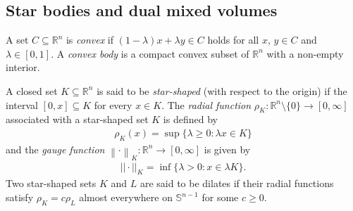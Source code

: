 \documentclass[preprint,12pt]{elsarticle}
\begin{document}
	\subsection{Star bodies and dual mixed volumes}
	
	A set $ C \subseteq \mathbb{R}^{n} $ is {\it convex} if $ \left( 1-\lambda \right)x + \lambda y \in C $ holds for all $ x$, $y \in C $ and $ \lambda \in \left[ 0,1 \right] $. A {\it convex body} is a compact convex subset of $\mathbb{R}^{n}$ with a non-empty interior.
	
	A closed set $K \subseteq \mathbb{R}^{n}$ is said to be {\it star-shaped} (with respect to the origin) if the interval $\left[ 0,x \right] \subseteq K$ for every $x \in K$.
	The {\it radial function} $\rho_K:\mathbb{R}^n \setminus \{0\} \to [0,\infty ]$ associated with a star-shaped set $K$ is defined by
	\begin{eqnarray}
		{\rho}_{K}(x)=\sup\{ \lambda \geq 0:\lambda x\in K\}\nonumber
	\end{eqnarray}
	and the {\it gauge function} $\left \| \cdot  \right \|_{K}:\mathbb{R}^{n}\to \left [ 0,\infty  \right ] $ is given by 
	\begin{eqnarray}
		{||\cdot ||}_{K}=\inf\{ \lambda >0:x\in\lambda K\}.\nonumber
	\end{eqnarray}
	Two star-shaped sets $K$ and $L$ are said to be dilates if their radial functions satisfy $ {\rho}_{K} = c{\rho}_{L}$ almost everywhere on $\mathbb{S}^{n-1}$ for some $c \geq 0$.
	
\end{document}
